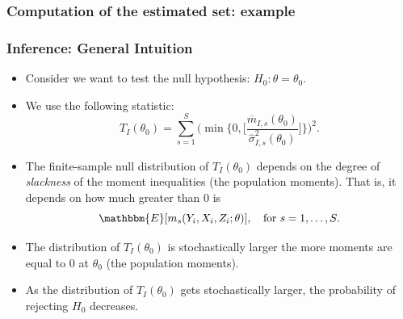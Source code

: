 \documentclass[10pt,letterpaper]{beamer}
\begin{document}
\begin{frame}
\frametitle{Computation of the estimated set: example}

\begin{figure}[h!]
\begin{center}
\end{center}
\end{figure}	
\end{frame}
\begin{frame}
\frametitle{Inference: General Intuition}

\begin{itemize}
	\item Consider we want to test the null hypothesis: $H_{0}: \theta=\theta_{0}$.
	\item We use the following statistic:
	\begin{equation*}
	T_{I}(\theta_{0})=\sum_{s=1}^{S}\Big(\min\{0,\Big[\frac{\overline{m}_{I,s}(\theta_{0})}{\hat{\sigma}^{2}_{I,s}(\theta_{0})}\Big]\}\Big)^{2}.
	\end{equation*}
	\item The finite-sample null distribution of $T_{I}(\theta_{0})$ depends on the degree of \textit{slackness} of the moment inequalities (the population moments). That is, it depends on how much greater than 0 is
	\begin{equation*}
	\mathbbm{E}[m_{s}(Y_{i},X_{i},Z_{i};\theta)],\quad\text{for $s=1,\dots,S$}.
	\end{equation*}
	\item The distribution of $T_{I}(\theta_{0})$ is stochastically larger the more moments are equal to 0 at $\theta_{0}$ (the population moments).
	\item As the distribution of $T_{I}(\theta_{0})$ gets stochastically larger, the probability of rejecting $H_{0}$ decreases.
\end{itemize}
\end{frame}
\end{document}
